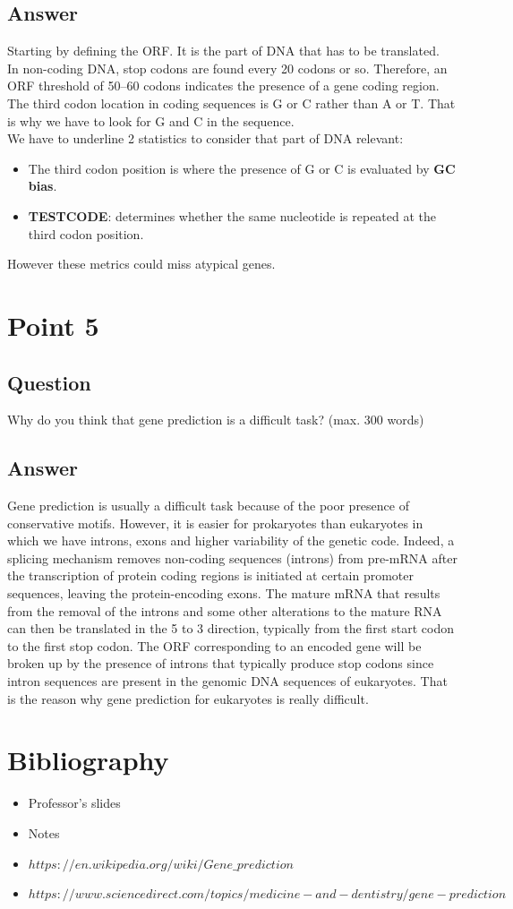 \documentclass{article}
\begin{document}
\subsection*{Answer}
Starting by defining the ORF. It is the part of DNA that has to be translated. \\
In non-coding DNA, stop codons are found every 20 codons or so.
Therefore, an ORF threshold of 50–60 codons indicates the presence of a gene coding region.
The third codon location in coding sequences is G or C rather than A or T. 
That is why we have to look for G and C in the sequence. \\
We have to underline 2 statistics to consider that part of DNA relevant:
\begin{itemize}
    \item The third codon position is where the presence of G or C is evaluated by \textbf{GC bias}.
    \item \textbf{TESTCODE}: determines whether the same nucleotide is repeated at the third codon position.

\end{itemize}
However these metrics could miss atypical genes. 
\clearpage
\section{Point 5}
\subsection*{Question}
Why do you think that gene prediction is a difficult task? (max. 300 words)
\subsection*{Answer}
Gene prediction is usually a difficult task 
because of the poor presence of
conservative motifs.
 However, it is easier 
 for prokaryotes than eukaryotes 
in which we have introns, 
exons and higher variability of the genetic code. 
Indeed, a splicing mechanism removes
 non-coding sequences (introns) from pre-mRNA 
after the transcription of protein coding regions
 is initiated at certain promoter sequences,
  leaving the protein-encoding exons. 
  The mature mRNA that results 
  from the removal of the introns 
  and some other alterations
   to the mature RNA can then be 
   translated in the 5 to 3 direction, 
   typically from the first start codon 
   to the first stop codon. The ORF 
   corresponding to an encoded gene
    will be broken up by the presence 
    of introns that typically produce 
    stop codons since intron sequences are present 
in the genomic DNA sequences of eukaryotes. That is the reason why gene prediction for 
eukaryotes is really difficult. 

\section{Bibliography}
\begin{itemize}
    \item Professor's slides
    \item Notes
    \item ${https://en.wikipedia.org/wiki/Gene\_prediction}$
    \item ${https://www.sciencedirect.com/topics/medicine-and-dentistry/gene-prediction}$
\end{itemize}
\end{document}
